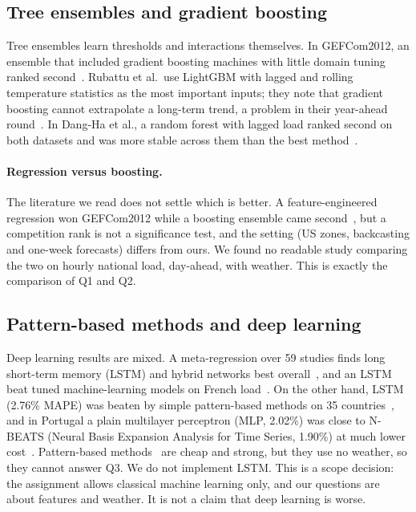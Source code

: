 \subsection{Tree ensembles and gradient boosting}
\label{sec:lit-trees}

Tree ensembles learn thresholds and interactions themselves. In GEFCom2012, an ensemble that
included gradient boosting machines with little domain tuning ranked second~\cite{lloyd2014gefcom}.
Rubattu et al.\ use LightGBM with lagged and rolling temperature statistics as the most important
inputs; they note that gradient boosting cannot extrapolate a long-term trend, a problem in their
year-ahead round~\cite{rubattu2023electricity}. In Dang-Ha et al., a random forest with lagged load
ranked second on both datasets and was more stable across them than the best
method~\cite{dangha2017local}.

\paragraph{Regression versus boosting.}
The literature we read does not settle which is better. A feature-engineered regression won
GEFCom2012 while a boosting ensemble came second~\cite{hong2013gefcomwinners}, but a competition rank
is not a significance test, and the setting (US zones, backcasting and one-week forecasts) differs
from ours. We found no readable study comparing the two on hourly national load, day-ahead, with
weather. This is exactly the comparison of Q1 and Q2.

\subsection{Pattern-based methods and deep learning}
\label{sec:lit-dl}

Deep learning results are mixed. A meta-regression over 59 studies finds long short-term memory (LSTM) and hybrid networks
best overall~\cite{hopf2023meta}, and an LSTM beat tuned machine-learning models on French
load~\cite{bouktif2018optimal}. On the other hand, LSTM (2.76\% MAPE) was beaten by simple
pattern-based methods on 35 countries~\cite{smyl2023esdrnn}, and in Portugal a plain multilayer perceptron (MLP, 2.02\%)
was close to N-BEATS (Neural Basis Expansion Analysis for Time Series, 1.90\%) at much lower cost~\cite{pelekis2023comparative}. Pattern-based
methods~\cite{dudek2021ensembles} are cheap and strong, but they use no weather, so they cannot
answer Q3. We do not implement LSTM. This is a scope decision: the assignment allows classical
machine learning only, and our questions are about features and weather. It is not a claim that
deep learning is worse.

